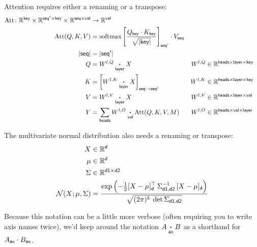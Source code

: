 Attention requires either a renaming or a transpose:
\begin{align*}
  \text{Att} \colon \mathbb{R}^{\name{key}} \times \mathbb{R}^{\name{seq'} \times\name{key}} \times \mathbb{R}^{\name{seq} \times\name{val}} &\rightarrow \mathbb{R}^{\name{val}} \\
  \text{Att}(Q,K,V) &= \softmax \left[ \frac{Q_{\name{key}} \cdot K_{\name{key}}}{\sqrt{|\name{key}|}} \right]_{\name{seq'}} \cdot V_{\name{seq}} \\
  |\name{seq}| &= |\name{seq'}| \\
  Q &= W^{l,Q} \ndot{layer} X & W^{l,Q} &\in \mathbb{R}^{\name{heads} \times \name{layer} \times \name{key}} \\
  K &= \nmov{seq}{seq'}{W^{l,K} \ndot{layer} X} & W^{l,K} &\in \mathbb{R}^{\name{heads} \times \name{layer} \times \name{key}} \\
  V &= W^{l,V} \ndot{layer} X & W^{l,V} &\in \mathbb{R}^{\name{heads} \times \name{layer} \times \name{val}} \\
  Y &= \nsum{heads} W^{l,O} \ndot{val} \text{Att}(Q, K, V, M) & W^{l,O} &\in \mathbb{R}^{\name{heads} \times \name{val} \times \name{layer}}
\end{align*}

The multivariate normal distribution also needs a renaming or transpose:
\begin{align*} 
X &\in \mathbb{R}^{\name{d}}  \\
\mu &\in \mathbb{R}^{\name{d}}  \\
\Sigma & \in \mathbb{R}^{\name{d1} \times \name{d2}}  \\
{\cal N}(X; \mu, \Sigma) &= \frac{\displaystyle \exp\left(-\tfrac{1}{2} [X - \mu]_{\name{d}}^\top \, \Sigma_{\name{d1},\name{d2}}^{-1} \, [X - \mu]_{\name{d}} \right)}{\sqrt{(2 \pi)^k \, \mathop{\text{det}} \Sigma_{\name{d1},\name{d2}}}}
\end{align*}

Because this notation can be a little more verbose (often requiring you to write axis names twice), we'd keep around the notation $A \ndot{ax} B$ as a shorthand for $A_{\name{ax}} \cdot B_{\name{ax}}$.

